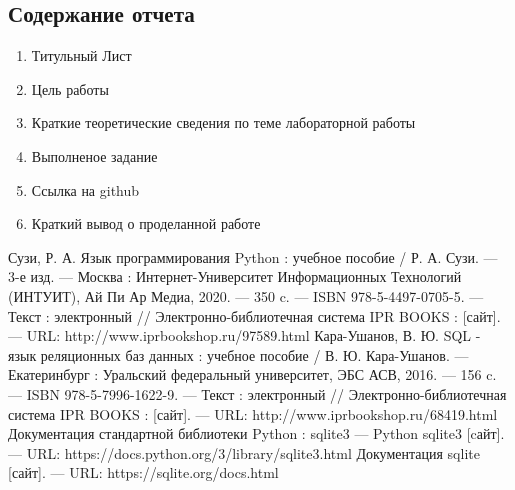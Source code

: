 \documentclass[a4paper]{article}
\begin{document}
\subsection{Содержание отчета}
\begin{enumerate}
  \item Титульный Лист
  \item Цель работы
  \item Краткие теоретические сведения по теме лабораторной работы
  \item Выполненое задание
  \item Ссылка на github
  \item Краткий вывод о проделанной работе
\end{enumerate}

\begin{thebibliography}{3}
  Сузи, Р. А. Язык программирования Python : учебное пособие / Р. А. Сузи. — 3-е изд. — Москва : Интернет-Университет Информационных Технологий (ИНТУИТ), Ай Пи Ар Медиа, 2020. — 350 c. — ISBN 978-5-4497-0705-5. — Текст : электронный // Электронно-библиотечная система IPR BOOKS : [сайт]. — URL: http://www.iprbookshop.ru/97589.html
  Кара-Ушанов, В. Ю. SQL - язык реляционных баз данных : учебное пособие / В. Ю. Кара-Ушанов. — Екатеринбург : Уральский федеральный университет, ЭБС АСВ, 2016. — 156 c. — ISBN 978-5-7996-1622-9. — Текст : электронный // Электронно-библиотечная система IPR BOOKS : [сайт]. — URL: http://www.iprbookshop.ru/68419.html 
   Документация стандартной библиотеки Python : sqlite3 — Python sqlite3 [cайт]. --- URL: https://docs.python.org/3/library/sqlite3.html
   Документация sqlite [сайт]. --- URL: https://sqlite.org/docs.html
\end{thebibliography}
\end{document}
